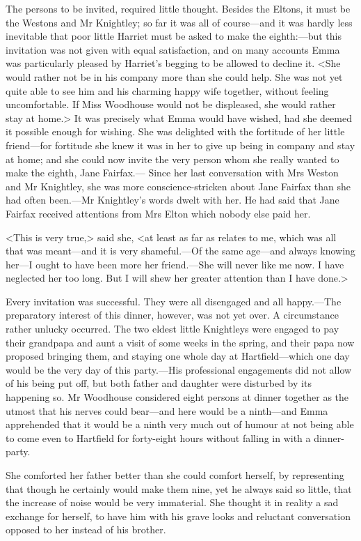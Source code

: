 The persons to be invited, required little thought. Besides the Eltons, it must be the Westons and Mr Knightley; so far it was all of course—and it was hardly less inevitable that poor little Harriet must be asked to make the eighth:—but this invitation was not given with equal satisfaction, and on many accounts Emma was particularly pleased by Harriet's begging to be allowed to decline it. <She would rather not be in his company more than she could help. She was not yet quite able to see him and his charming happy wife together, without feeling uncomfortable. If Miss Woodhouse would not be displeased, she would rather stay at home.> It was precisely what Emma would have wished, had she deemed it possible enough for wishing. She was delighted with the fortitude of her little friend—for fortitude she knew it was in her to give up being in company and stay at home; and she could now invite the very person whom she really wanted to make the eighth, Jane Fairfax.— Since her last conversation with Mrs Weston and Mr Knightley, she was more conscience-stricken about Jane Fairfax than she had often been.—Mr Knightley's words dwelt with her. He had said that Jane Fairfax received attentions from Mrs Elton which nobody else paid her.

<This is very true,> said she, <at least as far as relates to me, which was all that was meant—and it is very shameful.—Of the same age—and always knowing her—I ought to have been more her friend.—She will never like me now. I have neglected her too long. But I will shew her greater attention than I have done.>

Every invitation was successful. They were all disengaged and all happy.—The preparatory interest of this dinner, however, was not yet over. A circumstance rather unlucky occurred. The two eldest little Knightleys were engaged to pay their grandpapa and aunt a visit of some weeks in the spring, and their papa now proposed bringing them, and staying one whole day at Hartfield—which one day would be the very day of this party.—His professional engagements did not allow of his being put off, but both father and daughter were disturbed by its happening so. Mr Woodhouse considered eight persons at dinner together as the utmost that his nerves could bear—and here would be a ninth—and Emma apprehended that it would be a ninth very much out of humour at not being able to come even to Hartfield for forty-eight hours without falling in with a dinner-party.

She comforted her father better than she could comfort herself, by representing that though he certainly would make them nine, yet he always said so little, that the increase of noise would be very immaterial. She thought it in reality a sad exchange for herself, to have him with his grave looks and reluctant conversation opposed to her instead of his brother.

